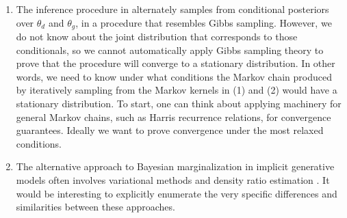 \documentclass[11pt]{article}
\begin{document}
\begin{enumerate}
\item The inference procedure in \citet{saatchiwilson2017} alternately samples from conditional posteriors over $\theta_d$ and $\theta_g$, in a procedure that resembles Gibbs sampling.  However, we do not know about the joint distribution that corresponds to those conditionals, so we cannot automatically apply Gibbs sampling theory to prove that the procedure will converge to a stationary distribution.  In other words, we need to know under what conditions the Markov chain produced by iteratively sampling from the Markov kernels in (1) and (2) would have a stationary distribution.   To start, one can think about applying machinery for general Markov chains, such as Harris recurrence relations, for convergence guarantees.  Ideally we want to prove convergence under the most relaxed conditions.
\item The alternative approach to Bayesian marginalization in implicit generative models often involves variational methods and density ratio estimation \citep{tran2017deep, mohamed2016learning}.  It would be interesting to explicitly enumerate the very specific differences and similarities between these approaches.
\end{enumerate}

 
   
 






\end{document}
